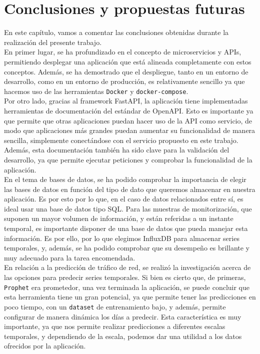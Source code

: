\documentclass[a4paper, oneside, 12pt]{book}
\begin{document}
	\pagebreak
	
	\chapter{Conclusiones y propuestas futuras}
	
	\noindent En este capítulo, vamos a comentar las conclusiones obtenidas durante la realización del presente trabajo. \\
	
	\noindent En primer lugar, se ha profundizado en el concepto de microservicios y APIs, permitiendo desplegar una aplicación que está alineada completamente con estos conceptos. Además, se ha demostrado que el despliegue, tanto en un entorno de desarrollo, como en un entorno de producción, es relativamente sencillo ya que hacemos uso de las herramientas \texttt{Docker} y \texttt{docker-compose}. \\
	
	\noindent Por otro lado, gracias al framework FastAPI, la aplicación tiene implementadas herramientas de documentación del estándar de OpenAPI. Esto es importante ya que permite que otras aplicaciones puedan hacer uso de la API como servicio, de modo que aplicaciones más grandes puedan aumentar su funcionalidad de manera sencilla, simplemente conectándose con el servicio propuesto en este trabajo. Además, esta documentación también ha sido clave para la validación del desarrollo, ya que permite ejecutar peticiones y comprobar la funcionalidad de la aplicación. \\

	\noindent En el tema de bases de datos, se ha podido comprobar la importancia de elegir las bases de datos en función del tipo de dato que queremos almacenar en nuestra aplicación. Es por esto por lo que, en el caso de datos relacionados entre sí, es ideal usar una base de datos tipo SQL. Para las muestras de monitorización, que suponen un mayor volumen de información, y están referidas a un instante temporal, es importante disponer de una base de datos que pueda manejar esta información. Es por ello, por lo que elegimos InfluxDB para almacenar series temporales, y, además, se ha podido comprobar que su desempeño es brillante y muy adecuado para la tarea encomendada. \\
	
	\noindent En relación a la predicción de tráfico de red, se realizó la investigación acerca de las opciones para predecir series temporales. Si bien es cierto que, de primeras, \texttt{Prophet} era prometedor, una vez terminada la aplicación, se puede concluir que esta herramienta tiene un gran potencial, ya que permite tener las predicciones en poco tiempo, con un \texttt{dataset} de entrenamiento bajo, y además, permite configurar de manera dinámica los días a predecir. Esta característica es muy importante, ya que nos permite realizar predicciones a diferentes escalas temporales, y dependiendo de la escala, podemos dar una utilidad a los datos ofrecidos por la aplicación. \\
	
\end{document}
